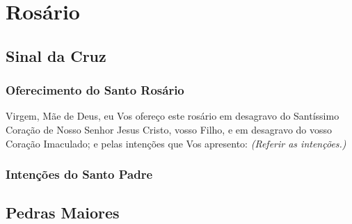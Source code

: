 \section{Rosário}

\subsection{Sinal da Cruz}



\subsubsection{Oferecimento do Santo Rosário}

 Virgem, Mãe de Deus, eu Vos ofereço este rosário em desagravo do Santíssimo Coração de Nosso Senhor Jesus Cristo, vosso Filho, e em desagravo do vosso Coração Imaculado; e pelas intenções que Vos apresento: \emph{(Referir as intenções.)}

\subsubsection{Intenções do Santo Padre}
\begin{compactitem}
\begin{paracol}{2}\switchcolumn{}\switchcolumn*{}\switchcolumn{}\switchcolumn*{}\switchcolumn{}\switchcolumn*{}\switchcolumn{}\switchcolumn*{}\switchcolumn{}\end{paracol}
\end{compactitem}

\subsection{Pedras Maiores}

